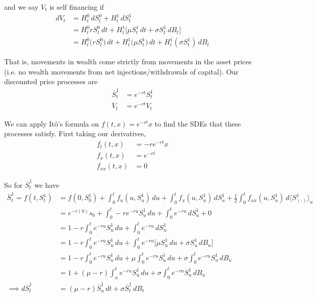 \documentclass[12pt]{article}
\newlength\tindent
\renewcommand{\indent}{\hspace*{\tindent}}
\begin{document}
and we say $V_t$ is self financing if
\begin{align*}
	dV_t &= H^0_t\,dS^0_t + H^1_t\,dS^1_t \\
	&= H^0_trS^0_t\,dt + H^1_t\big[\mu S^1_t\,dt + \sigma S^1_t\,dB_t\big] \\
	&= H^0_t\big(rS^0_t\big)\,dt + H^1_t\big(\mu S^1_t\big)\,dt + H^1_t(\sigma S^1_t)\,dB_t
\end{align*}

\indent That is, movements in wealth come strictly from movements in the asset prices (i.e. no wealth movements from net injections/withdrawals of capital). Our discounted price processes are
\begin{align*}
	\overline{S}^1_t &= e^{-rt}S^1_t \\
	\overline{V}_t &= e^{-rt}V_t
\end{align*}

\indent We can apply It\^{o}'s formula on $f(t,x) = e^{-rt}x$ to find the SDEs that these processes satisfy. First taking our derivatives,
\begin{align*}
	f_t(t,x) &= -re^{-rt}x \\
	f_x(t,x) &= e^{-rt} \\
	f_{xx}(t,x) &= 0
\end{align*}

So for $\overline{S}^1_t$ we have
\begin{align*}
	\overline{S}^1_t = f(t,S^1_t) &= f(0,S^1_0) + \int^t_0 f_u(u,S^1_u)\,du + \int^t_0 f_x(u,S^1_u)\,dS^1_u + \frac{1}{2}\int^t_0 f_{xx}(u,S^1_u)\,d\langle S^1_{(\cdot)}\rangle_u \\
	&= e^{-r(0)}s_0 + \int^t_0 -re^{-ru}S^1_u\,du + \int^t_0 e^{-ru}\,dS^1_u + 0 \\
	&= 1 - r\int^t_0 e^{-ru}S^1_u\,du + \int^t_0 e^{-ru}\,dS^1_u \\
	&= 1 - r\int^t_0 e^{-ru}S^1_u\,du + \int^t_0 e^{-ru}\big[\mu S^1_u\,du + \sigma S^1_u\,dB_u \big] \\
	&= 1 - r\int^t_0 e^{-ru}S^1_u\,du  + \mu\int^t_0 e^{-ru}S^1_u\,du + \sigma\int^t_0 e^{-ru}S^1_u\,dB_u \\
	&= 1 + (\mu-r)\int^t_u e^{-ru}S^1_u\,du + \sigma\int^t_0 e^{-ru}S^1_u\,dB_u \\
	\implies d\overline{S}^1_t &= (\mu - r)\overline{S}^1_u\,dt + \sigma\overline{S}^1_t\,dB_t
\end{align*}
\end{document}
